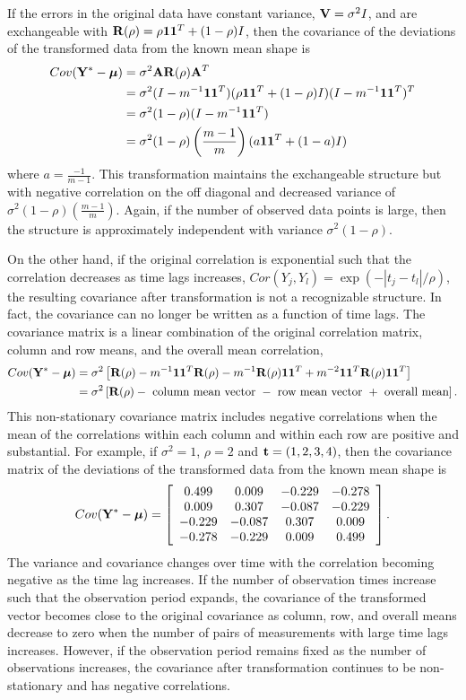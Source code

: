  If the errors in the original data have constant variance, $\mathbf V=\sigma^{2}I$, and are exchangeable with $\mathbf R(\rho) = \rho\mathbf 1 \mathbf 1^{T} + (1-\rho) I$, then the covariance of the deviations of the transformed data from the known mean shape is
 \begin{align*}
 Cov(\mathbf Y^{*}- \boldsymbol\mu) &= \sigma^{2}\mathbf A\mathbf R(\rho)\mathbf A^{T}\\
 &= \sigma^{2}(I-m^{-1}\mathbf1\mathbf1^{T})(\rho\mathbf1\mathbf1^{T}+(1-\rho)I)(I-m^{-1}\mathbf1\mathbf1^{T})^{T}\\
 &= \sigma^{2}(1-\rho)(I-m^{-1}\mathbf1\mathbf1^{T})\\
 &=\sigma^{2}(1-\rho)\left(\frac{m-1}{m}\right)(a\mathbf 1\mathbf 1^{T}+ (1-a)I)
 \end{align*} 
 where $a=\frac{-1}{m-1}$. This transformation maintains the exchangeable structure but with negative correlation on the off diagonal and decreased variance of $\sigma^{2}(1-\rho)\left(\frac{m-1}{m}\right)$.  Again, if the number of observed data points is large, then the structure is approximately independent with variance $\sigma^{2}(1-\rho)$.

 On the other hand, if the original correlation is exponential such that the correlation decreases as time lags increases, $Cor(Y_{j},Y_{l}) = \exp(-|t_{j}-t_{l}|/\rho)$, the resulting covariance after transformation is not a recognizable structure. In fact, the covariance can no longer be written as a function of time lags. The covariance matrix is a linear combination of the original correlation matrix, column and row means, and the overall mean correlation,
   \begin{align*}
 Cov(\mathbf Y^{*}- \boldsymbol\mu) &= \sigma^{2}\left[\mathbf R(\rho)-m^{-1}\mathbf1\mathbf1^{T}\mathbf R(\rho)-m^{-1}\mathbf R(\rho)\mathbf1\mathbf1^{T} + m^{-2}\mathbf1\mathbf1^{T}\mathbf R(\rho)\mathbf1\mathbf1^{T}\right]\\
  &= \sigma^{2}\left[\mathbf R(\rho)-\text{ column mean vector }-\text{ row mean vector } + \text{ overall mean}\right].
 \end{align*} 
 This non-stationary covariance matrix includes negative correlations when the mean of the correlations within each column and within each row are positive and substantial. For example, if $\sigma^{2}=1$, $\rho = 2$ and $\mathbf t=(1,2,3,4)$, then the covariance matrix of the deviations of the transformed data from the known mean shape is
$$ Cov(\mathbf Y^{*}- \boldsymbol\mu) = \left[ \begin{array}{cccc}
 0.499&  0.009& -0.229& -0.278\\
  0.009&  0.307& -0.087& -0.229\\
 -0.229& -0.087&  0.307&  0.009\\
 -0.278& -0.229&  0.009&  0.499
\end{array}\right].$$
The variance and covariance changes over time with the correlation becoming negative as the time lag increases.  If the number of observation times increase such that the observation period expands, the covariance of the transformed vector becomes close to the original covariance as column, row, and overall means decrease to zero when the number of pairs of measurements with large time lags increases. However, if the observation period remains fixed as the number of observations increases, the covariance after transformation continues to be non-stationary and has negative correlations.  

